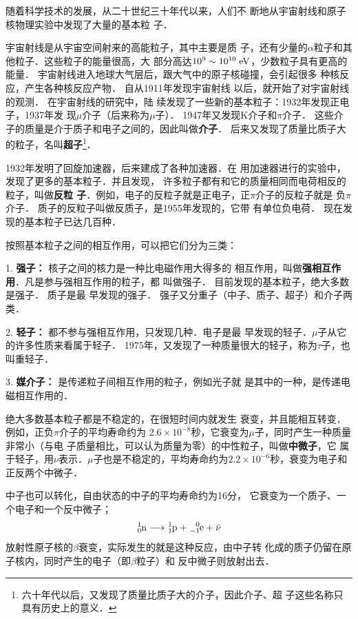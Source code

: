 随着科学技术的发展，从二十世纪三十年代以来，人们不
断地从宇宙射线和原子核物理实验中发现了大量的基本粒
子．

宇宙射线是从宇宙空间射来的高能粒子，其中主要是质
子，还有少量的$\alpha$粒子和其他粒子．这些粒子的能量很高，大
部分高达$10^9 \sim 10^{10} \;\text{eV}$，少数粒子具有更高的能量．
宇宙射线进入地球大气层后，跟大气中的原子核碰撞，会引起很多
种核反应，产生各种核反应产物．
自从1911年发现宇宙射线
以后，就开始了对宇宙射线的观测．
在宇宙射线的研究中，陆
续发现了一些新的基本粒子：1932年发现正电子，1937年发
现$\mu$介子（后来称为$\mu$子）．
1947年又发现K介子和$\pi$介子．
这些介子的质量是介于质子和电子之间的，因此叫做\textbf{介子}．
后来又发现了质量比质子大的粒子，名叫\textbf{超子}\footnote{六十年代以后，又发现了质量比质子大的介子，因此介子、超
子这些名称只具有历史上的意义．}．

1932年发明了回旋加速器，后来建成了各种加速器．在
用加速器进行的实验中，发现了更多的基本粒子．并且发现，
许多粒子都有和它的质量相同而电荷相反的粒子，叫做\textbf{反粒
子}．例如，电子的反粒子就是正电子，正$\pi$介子的反粒子就是
负$\pi$介子．
质子的反粒子叫做反质子，是1955年发现的，它带
有单位负电荷．
现在发现的基本粒子已达几百种．

按照基本粒子之间的相互作用，可以把它们分为三类：

1. \textbf{强子：} 核子之间的核力是一种比电磁作用大得多的
相互作用，叫做\textbf{强相互作用}．凡是参与强相互作用的粒子，都
叫做强子．
目前发现的基本粒子，绝大多数是强子．
质子是最
早发现的强子．
强子又分重子（中子、质子、超子）和介子两类．

2. \textbf{轻子：} 都不参与强相互作用，只发现几种．电子是最
早发现的轻子．$\mu$子从它的许多性质来看属于轻子．
1975年，又发现了一种质量很大的轻子，称为$\tau$子，也叫重轻子．

3. \textbf{媒介子：} 是传递粒子间相互作用的粒子，例如光子就
是其中的一种，是传递电磁相互作用的．

绝大多数基本粒子都是不稳定的，在很短时间内就发生
衰变，并且能相互转变．
例如，正负$\pi$介子的平均寿命约为
$2.6\times10^{-8}$秒，它衰变为$\mu$子，同时产生一种质量非常小（与电
子质量相比，可以认为质量为零）的中性粒子，叫做\textbf{中微子}，它
属于轻子，用$\nu$表示．$\mu$子也是不稳定的，平均寿命约为$2.2\times
10^{-6}$秒，衰变为电子和正反两个中微子．

中子也可以转化，自由状态的中子的平均寿命约为16分，
它衰变为一个质子、一个电子和一个反中微子；
\[\atom{n}{1}{0}\longrightarrow \atom{p}{1}{1}+\atom{e}{0}{-1}+ \bar{\nu}   \]
放射性原子核的$\beta$衰变，实际发生的就是这种反应，由中子转
化成的质子仍留在原子核内，同时产生的电子（即$\beta$粒子）和
反中微子则放射出去．

